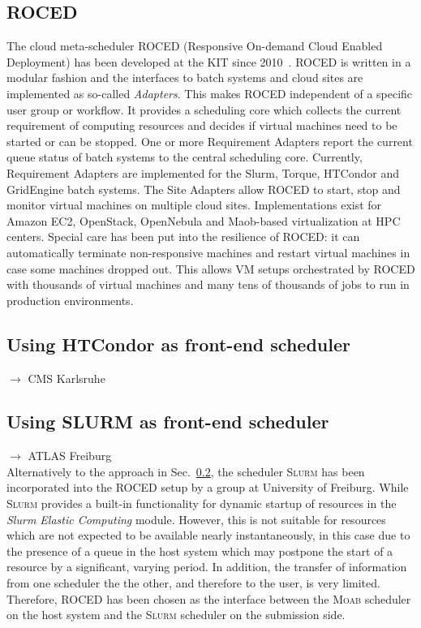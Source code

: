 \subsection{ROCED}
The cloud meta-scheduler ROCED (Responsive On-demand Cloud Enabled Deployment) has been developed at the KIT since 2010~\cite{ROCED}. ROCED is written in a modular
fashion and the interfaces to batch systems and cloud sites are implemented as so-called \textit{Adapters}. This makes ROCED independent of a specific user group or workflow. It provides a scheduling core which collects the current requirement of computing resources and decides if virtual machines need to be started or can be stopped. One or more Requirement Adapters report the current queue status of batch systems to the central scheduling core. Currently, Requirement Adapters are implemented for the Slurm, Torque, HTCondor and GridEngine batch systems. The Site Adapters allow ROCED to start, stop and monitor virtual machines on multiple cloud sites. Implementations exist for Amazon EC2, OpenStack, OpenNebula and Maob-based virtualization at HPC centers. Special care has been put into the resilience of ROCED: it can automatically terminate non-responsive machines and restart virtual machines in case some machines dropped out. This allows VM setups orchestrated by ROCED with thousands of virtual machines and many tens of thousands of jobs to run in production environments.

\subsection{Using HTCondor as front-end scheduler}\label{sec:ROCED:HTCondor}
$\to$ CMS Karlsruhe

\subsection{Using SLURM as front-end scheduler}
$\to$ ATLAS Freiburg\\
Alternatively to the approach in Sec.~\ref{sec:ROCED:HTCondor}, the
scheduler \textsc{Slurm} has been incorporated into the ROCED setup by
a group at University of Freiburg.
While \textsc{Slurm} provides a built-in functionality for dynamic
startup of resources in the \textit{Slurm Elastic Computing} module\cite{SlurmElastic}. 
However, this is not suitable for resources which are not
expected to be available nearly instantaneously, in this case due to
the presence of a queue in the host system which may postpone the start
of a resource by a significant, varying period.
In addition, the transfer of information from one scheduler the the
other, and therefore to the user, is very limited.
Therefore, ROCED has been chosen as the interface between the
\textsc{Moab} scheduler on the host system and the \textsc{Slurm}
scheduler on the submission side.

